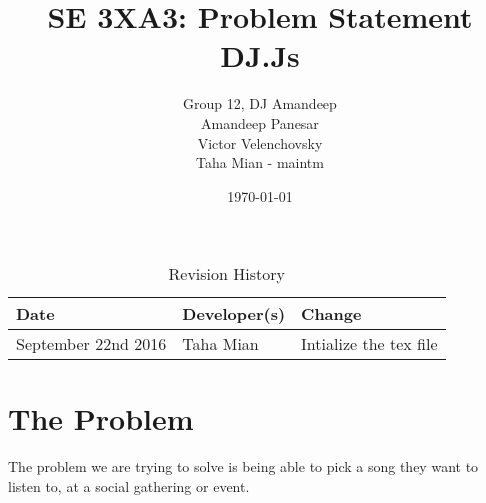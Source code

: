 \documentclass[11pt,fleqn]{article}
\title{SE 3XA3: Problem Statement\\DJ.Js}
\author{Group 12, DJ Amandeep\\
Amandeep Panesar \\ Victor Velenchovsky \\ Taha Mian - maintm}
\date{\today}
\begin{document}
\begin{table}[hp]
\caption{Revision History} \label{TblRevisionHistory}
\begin{tabularx}{\textwidth}{llX}
\toprule
\textbf{Date} & \textbf{Developer(s)} & \textbf{Change}\\
\midrule
September 22nd 2016 & Taha Mian & Intialize the tex file\\

\bottomrule
\end{tabularx}
\end{table}
\maketitle
\section{ The Problem}
The problem we are trying to solve is being able to pick a song they want to listen to, at a social gathering or event.
\section{}
\end{document}
